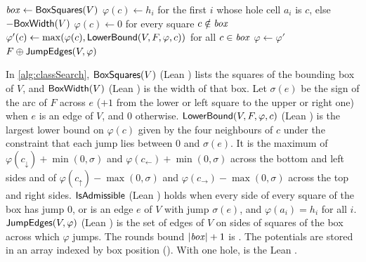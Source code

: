 \begin{algorithm}[htbp]
\caption{ (Lean , with  and
  )}
\label{alg:classSearch}
\begin{algorithmic}[1]
  \State $\mathit{box}\gets\textsf{BoxSquares}(V)$
    \State $\varphi(c)\gets h_i$ for the first $i$ whose hole cell $a_i$ is $c$, else $-\textsf{BoxWidth}(V)$
  \EndFor
  \State $\varphi(c)\gets0$ for every square $c\notin\mathit{box}$
    \State $\varphi'(c)\gets\max(\varphi(c),\textsf{LowerBound}(V,F,\varphi,c))$ for all
      $c\in\mathit{box}$
     \pcbreak
    \EndIf
    \State $\varphi\gets\varphi'$
  \EndFor
    \Return $F\oplus\textsf{JumpEdges}(V,\varphi)$
  \Else\ \Return \pcnone
  \EndIf
\EndFunction
\end{algorithmic}
\end{algorithm}

In \cref{alg:classSearch}, $\textsf{BoxSquares}(V)$ (Lean ) lists the squares of the bounding
box of $V$, and $\textsf{BoxWidth}(V)$ (Lean ) is the width of that box.
Let $\sigma(e)$ be the sign of the arc of $F$ across $e$ ($+1$ from the lower or left square to the
upper or right one) when $e$ is an edge of $V$, and $0$ otherwise.
$\textsf{LowerBound}(V,F,\varphi,c)$ (Lean ) is the largest lower bound on $\varphi(c)$
given by the four neighbours of $c$ under the constraint that each jump lies between $0$ and
$\sigma(e)$.
It is the maximum of $\varphi(c_\downarrow)+\min(0,\sigma)$ and
$\varphi(c_\leftarrow)+\min(0,\sigma)$ across the bottom and left sides and of
$\varphi(c_\uparrow)-\max(0,\sigma)$ and $\varphi(c_\rightarrow)-\max(0,\sigma)$ across the top
and right sides.
$\textsf{IsAdmissible}$ (Lean ) holds when every side of every square of the box has jump
$0$, or is an edge $e$ of $V$ with jump $\sigma(e)$, and $\varphi(a_i)=h_i$ for all $i$.
$\textsf{JumpEdges}(V,\varphi)$ (Lean ) is the set of edges of $V$ on sides of squares of the
box across which $\varphi$ jumps.
The rounds bound $|\mathit{box}|+1$ is .
The potentials are stored in an array indexed by box position ().
With one hole,  is the Lean .

